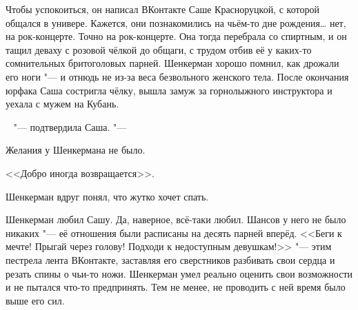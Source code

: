 Чтобы успокоиться, он написал ВКонтакте Саше Красноруцкой, с которой общался в универе.
Кажется, они познакомились на чьём-то дне рождения\ldots{} нет, на рок-концерте.
Точно на рок-концерте.
Она тогда перебрала со спиртным, и он тащил деваху с розовой чёлкой до общаги, с трудом отбив её у каких-то сомнительных бритоголовых парней.
Шенкерман хорошо помнил, как дрожали его ноги "--- и отнюдь не из-за веса безвольного женского тела.
После окончания юрфака Саша состригла чёлку, вышла замуж за горнолыжного инструктора и уехала с мужем на Кубань.

\hspace{0.2em}


~ "--- подтвердила Саша. "---

\hspace{0.2em}






Желания у Шенкермана не было.

\hspace{0.2em}






<<Добро иногда возвращается>>.

Шенкерман вдруг понял, что жутко хочет спать.

\asterism

Шенкерман любил Сашу.
Да, наверное, всё-таки любил.
Шансов у него не было никаких "--- её отношения были расписаны на десять парней вперёд.
<<Беги к мечте!
Прыгай через голову!
Подходи к недоступным девушкам!>> "--- этим пестрела лента ВКонтакте, заставляя его сверстников разбивать свои сердца и резать спины о чьи-то ножи.
Шенкерман умел реально оценить свои возможности и не пытался что-то предпринять.
Тем не менее, не проводить с ней время было выше его сил.

